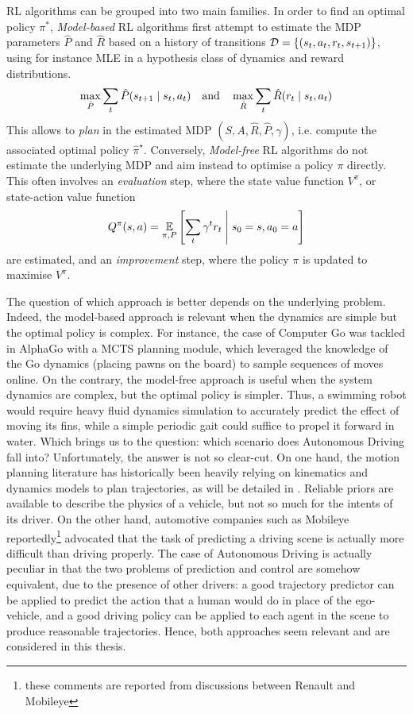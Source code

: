 \ac*{RL} algorithms can be grouped into two main families. 
In order to find an optimal policy $\pi^*$, \emph{Model-based} \ac*{RL} algorithms first attempt to estimate the \ac*{MDP} parameters $\hat{P}$ and $\hat{R}$ based on a history of transitions $\mathcal{D} = \{(s_{t},a_t, r_t, s_{t+1})\}$, using for instance \ac{MLE} in a hypothesis class of dynamics and reward distributions.
\begin{equation*}
\max_{\hat{P}} \sum_{t}\hat{P}\lparen s_{t+1} \mid s_t,a_t\rparen \quad \text{and} \quad \max_{\hat{R}} \sum_{t}\hat{R}\lparen r_{t} \mid s_t,a_t\rparen
\end{equation*}
This allows to \emph{plan} in the estimated \ac*{MDP} $(S,A,\hat{R}, \hat{P}, \gamma)$, i.e. compute the associated optimal policy $\hat{\pi}^\star$. Conversely, \emph{Model-free} \ac*{RL} algorithms do not estimate the underlying \ac*{MDP} and aim instead to optimise a policy $\pi$ directly. This often involves an \emph{evaluation} step, where the state value function $V^\pi$, or state-action value function
\begin{equation*}
Q^\pi(s,a) = \operatorname*{\mathbb{E}}_{\pi, P} \left[\sum_t \gamma^t r_t\;\middle|\; s_0 = s, a_0 = a\right]
\end{equation*}
are estimated, and an \emph{improvement} step, where the policy $\pi$ is updated to maximise $V^\pi$.

The question of which approach is better depends on the underlying problem. Indeed, the model-based approach is relevant when the dynamics are simple but the optimal policy is complex. For instance, the case of Computer Go was tackled in AlphaGo \citep{Silver2016,Silver2017,Silver2018} with a \ac{MCTS} planning module, which leveraged the knowledge of the Go dynamics (placing pawns on the board) to sample sequences of moves online. On the contrary, the model-free approach is useful when the system dynamics are complex, but the optimal policy is simpler. Thus, a swimming robot would require heavy fluid dynamics simulation to accurately predict the effect of moving its fins, while a simple periodic gait could suffice to propel it forward in water. Which brings us to the question: which scenario does Autonomous Driving fall into? Unfortunately, the answer is not so clear-cut. On one hand, the motion planning literature has historically been heavily relying on kinematics and dynamics models to plan trajectories, as will be detailed in . Reliable priors are available to describe the physics of a vehicle, but not so much for the intents of its driver. On the other hand, automotive companies such as Mobileye reportedly\footnote{these comments are reported from discussions between Renault and Mobileye} advocated that the task of predicting a driving scene is actually more difficult than driving properly. The case of Autonomous Driving is actually peculiar in that the two problems of prediction and control are somehow equivalent, due to the presence of other drivers: a good trajectory predictor can be applied to predict the action that a human would do in place of the ego-vehicle, and a good driving policy can be applied to each agent in the scene to produce reasonable trajectories. Hence, both approaches seem relevant and are considered in this thesis.

